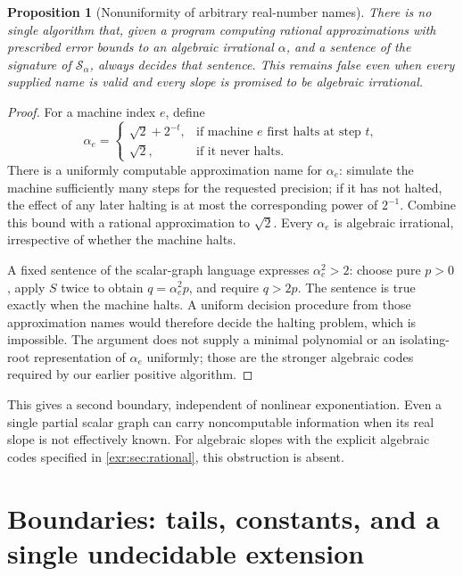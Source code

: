 \documentclass[11pt,letterpaper]{article}
\numberwithin{equation}{section}
\newtheorem{proposition}[proposition]{Proposition}
\theoremstyle{definition}
\theoremstyle{remark}
\begin{document}
\begin{proposition}[Nonuniformity of arbitrary real-number names]\label{exr:prop:nonuniform}
There is no single algorithm that, given a program computing rational
approximations with prescribed error bounds to an algebraic irrational $\alpha$,
and a sentence of the signature of $\mathcal S_\alpha$, always decides that
sentence. This remains false even when every supplied name is valid and every
slope is promised to be algebraic irrational.
\end{proposition}
\begin{proof}
For a machine index $e$, define
\begin{equation}
 \alpha_e=\begin{cases}
 \sqrt2+2^{-t},&\text{if machine }e\text{ first halts at step }t,\\
 \sqrt2,&\text{if it never halts}.
 \end{cases}
\end{equation}
There is a uniformly computable approximation name for $\alpha_e$: simulate the
machine sufficiently many steps for the requested precision; if it has not
halted, the effect of any later halting is at most the corresponding power of
$2^{-1}$. Combine this bound with a rational approximation to $\sqrt2$.
Every $\alpha_e$ is algebraic irrational, irrespective of whether the machine
halts.

A fixed sentence of the scalar-graph language expresses
$\alpha_e^2>2$: choose pure $p>0$, apply $S$ twice to obtain $q=\alpha_e^2p$, and
require $q>2p$. The sentence is true exactly when the machine halts. A uniform
decision procedure from those approximation names would therefore decide the
halting problem, which is impossible. The argument does not supply a minimal
polynomial or an isolating-root representation of $\alpha_e$ uniformly; those
are the stronger algebraic codes required by our earlier positive algorithm.
\end{proof}

This gives a second boundary, independent of nonlinear exponentiation. Even a
single partial scalar graph can carry noncomputable information when its real
slope is not effectively known. For algebraic slopes with the explicit algebraic
codes specified in \cref{exr:sec:rational}, this obstruction is absent.

\section{Boundaries: tails, constants, and a single undecidable extension}\label{exr:sec:boundaries}
\end{document}
